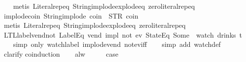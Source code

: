 \begin{isabellebody}
%
\isadelimproof
\ \ %
\endisadelimproof
%
\isatagproof
{}\isamarkupfalse%
\ {\isacharparenleft}metis\ Literal{\isachardot}rep{\isacharunderscore}eq\ String{\isachardot}implode{\isacharunderscore}explode{\isacharunderscore}eq\ zero{\isacharunderscore}literal{\isachardot}rep{\isacharunderscore}eq{\isacharparenright}%
\endisatagproof
{\isafoldproof}%
%
\isadelimproof
\isanewline
%
\endisadelimproof
\isanewline
{}\isamarkupfalse%
\ implode{\isacharunderscore}coin{\isacharcolon}\ {\isachardoublequoteopen}String{\isachardot}implode\ {\isacharprime}{\isacharprime}coin{\isacharprime}{\isacharprime}\ {\isacharequal}\ STR\ {\isacharprime}{\isacharprime}coin{\isacharprime}{\isacharprime}{\isachardoublequoteclose}\isanewline
%
\isadelimproof
\ \ %
\endisadelimproof
%
\isatagproof
{}\isamarkupfalse%
\ {\isacharparenleft}metis\ Literal{\isachardot}rep{\isacharunderscore}eq\ String{\isachardot}implode{\isacharunderscore}explode{\isacharunderscore}eq\ zero{\isacharunderscore}literal{\isachardot}rep{\isacharunderscore}eq{\isacharparenright}%
\endisatagproof
{\isafoldproof}%
%
\isadelimproof
\isanewline
%
\endisadelimproof
\isanewline
{}\isamarkupfalse%
\ LTL{\isacharunderscore}label{\isacharunderscore}vend{\isacharunderscore}not{\isacharunderscore}{}{\isacharcolon}\ {\isachardoublequoteopen}{\isacharparenleft}{\isacharparenleft}LabelEq\ {\isacharprime}{\isacharprime}vend{\isacharprime}{\isacharprime}{\isacharparenright}\ impl\ {\isacharparenleft}not\ {\isacharparenleft}ev\ {\isacharparenleft}StateEq\ {\isacharparenleft}Some\ {}{\isacharparenright}{\isacharparenright}{\isacharparenright}{\isacharparenright}{\isacharparenright}\ {\isacharparenleft}watch\ drinks\ t{\isacharparenright}{\isachardoublequoteclose}\isanewline
%
\isadelimproof
\ \ %
\endisadelimproof
%
\isatagproof
{}\isamarkupfalse%
\ {\isacharparenleft}simp\ only{\isacharcolon}\ watch{\isacharunderscore}label\ implode{\isacharunderscore}vend\ not{\isacharunderscore}ev{\isacharunderscore}iff{\isacharparenright}\isanewline
\ \ \isamarkupfalse%
\ {\isacharparenleft}simp\ add{\isacharcolon}\ watch{\isacharunderscore}def{\isacharparenright}\isanewline
\ \ \isamarkupfalse%
\ clarify\isanewline
{}\isamarkupfalse%
{\isacharparenleft}coinduction{\isacharparenright}\isanewline
\ \ \isamarkupfalse%
\ alw\isanewline
\ \ \isamarkupfalse%
\ \isamarkupfalse%
\ {\isacharquery}case\isanewline
\ \ \ \ \isamarkupfalse%

\end{isabellebody}
